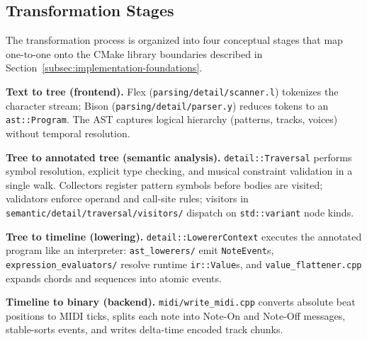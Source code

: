 \subsection{Transformation Stages}\label{detail-subsec:transformation-stages}

The transformation process is organized into four conceptual stages that map one-to-one onto the CMake library
boundaries described in Section~\ref{subsec:implementation-foundations}.

\noindent \textbf{Text to tree (frontend).} Flex (\texttt{parsing/detail/scanner.l}) tokenizes the character stream;
Bison (\texttt{parsing/detail/parser.y}) reduces tokens to an \texttt{ast::Program}.
The AST captures logical hierarchy (patterns, tracks, voices) without temporal resolution.

\noindent \textbf{Tree to annotated tree (semantic analysis).} \texttt{detail::Traversal} performs symbol resolution,
explicit type checking, and musical constraint validation in a single walk.
Collectors register pattern symbols before bodies are visited; validators enforce operand and call-site rules; visitors
in \texttt{semantic/detail/traversal/visitors/} dispatch on \texttt{std::variant} node kinds.

\noindent \textbf{Tree to timeline (lowering).} \texttt{detail::LowererContext} executes the annotated program like an
interpreter: \texttt{ast\_lowerers/} emit \texttt{NoteEvent}s, \texttt{expression\_evaluators/} resolve runtime
\texttt{ir::Value}s, and \texttt{value\_flattener.cpp} expands chords and sequences into atomic events.

\noindent \textbf{Timeline to binary (backend).} \texttt{midi/write\_midi.cpp} converts absolute beat positions to MIDI
ticks, splits each note into Note-On and Note-Off messages, stable-sorts events, and writes delta-time encoded track
chunks.

